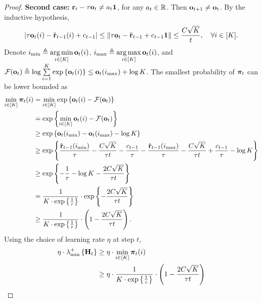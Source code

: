 \begin{proof}
\textbf{Second case:} ${\mathbf{r}}_t - \tau {\mathbf{o}}_t \not= a_t {\mathbf{1}}$, for any $a_t \in {\mathbb{R}}$. Then ${\mathbf{o}}_{t+1} \not= {\mathbf{o}}_t$. By the inductive hypothesis,
\begin{equation*}
\begin{split}
    \left| \tau {\mathbf{o}}_{t}(i) - \hat{{\mathbf{r}}}_{t-1}(i) + c_{t-1} \right| \le \left\| \tau {\mathbf{o}}_{t} - \hat{{\mathbf{r}}}_{t-1} + c_{t-1} {\mathbf{1}} \right\| \le \frac{C \sqrt{K}}{t}, \quad \forall i \in [K].
\end{split}
\end{equation*}
Denote $i_{\min} \triangleq \operatorname*{arg\,min}\limits_{i \in [K]}{{\mathbf{o}}_t(i)} $, $i_{\max} \triangleq \operatorname*{arg\,max}\limits_{i \in [K]}{{\mathbf{o}}_t(i)} $, and ${\mathcal{F}}({\mathbf{o}}_t) \triangleq \log{\sum\limits_{i = 1}^K{\exp\left\{ {\mathbf{o}}_t(i) \right\}} } \le {\mathbf{o}}_t(i_{\max}) + \log{K}$. The smallest probability of ${\boldsymbol{\pi}}_t$ can be lower bounded as
\begin{equation*}
\begin{split}
    \min\limits_{i \in [K]}{{\boldsymbol{\pi}}_t(i)} &= \min\limits_{i \in [K]}{ \exp\left\{ {\mathbf{o}}_t(i) - {\mathcal{F}}({\mathbf{o}}_t) \right\} } \\
    &= \exp\left\{ \min\limits_{i \in [K]}{{\mathbf{o}}_t(i)} - {\mathcal{F}}({\mathbf{o}}_t) \right\} \\
    &\ge \exp\left\{ {\mathbf{o}}_t(i_{\min}) - {\mathbf{o}}_t(i_{\max}) - \log{K} \right\} \\
    &\ge \exp\left\{ \frac{\hat{{\mathbf{r}}}_{t-1}(i_{\min})}{\tau} - \frac{C \sqrt{K}}{\tau t} - \frac{c_{t-1}}{\tau} - \frac{\hat{{\mathbf{r}}}_{t-1}(i_{\max})}{\tau} - \frac{C \sqrt{K}}{\tau t} + \frac{c_{t-1}}{\tau} - \log{K} \right\} \\
    &\ge \exp\left\{ - \frac{1}{\tau} - \log{K} - \frac{2 C \sqrt{K}}{\tau t} \right\} \\
    &= \frac{1}{ K \cdot \exp\left\{ \frac{1}{\tau} \right\} } \cdot \exp\left\{ - \frac{2 C \sqrt{K}}{\tau t} \right\} \\
    &\ge \frac{1}{K \cdot \exp\left\{ \frac{1}{\tau} \right\}} \cdot \left( 1 - \frac{2 C \sqrt{K}}{\tau t} \right).
\end{split}
\end{equation*}
Using the choice of learning rate $\eta$ at step $t$,
\begin{equation*}
\begin{split}
    \eta \cdot \lambda_{\min}^{+}\left\{ \rmH_t \right\} &\ge \eta \cdot \min\limits_{i \in [K]}{\rvpi_t(i)} \\
    &\ge \eta \cdot \frac{1}{K \cdot \exp\left\{ \frac{1}{\tau} \right\}} \cdot \left( 1 - \frac{2 C \sqrt{K}}{\tau t} \right) \\

\end{split}
\end{equation*}
\end{proof}
